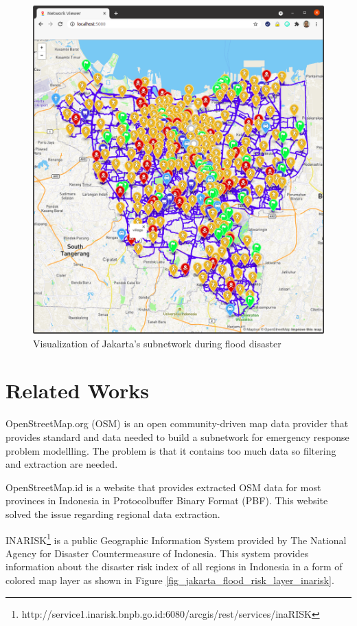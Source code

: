 \documentclass[conference]{IEEEtran}
\begin{document}
\begin{figure}
\centerline{\includegraphics[scale=0.25]{subnetwork-visualization.png}}
\caption{Visualization of Jakarta's subnetwork during flood disaster}
\label{fig_jakarta_subnetwork_visualized}
\end{figure}

\section{Related Works}

OpenStreetMap.org (OSM) \cite{haklay2008openstreetmap} is an open community-driven map data provider that provides standard and data needed to build a subnetwork for emergency response problem modellling. The problem is that it contains too much data so filtering and extraction are needed. 

OpenStreetMap.id is a website that provides extracted OSM data for most provinces in Indonesia in Protocolbuffer Binary Format (PBF). This website solved the issue regarding regional data extraction. 

INARISK\footnote{http://service1.inarisk.bnpb.go.id:6080/arcgis/rest/services/inaRISK} is a public Geographic Information System provided by The National Agency for Disaster Countermeasure of Indonesia. This system provides information about the disaster risk index of all regions in Indonesia in a form of colored map layer as shown in Figure \ref{fig_jakarta_flood_risk_layer_inarisk}.
\end{document}

